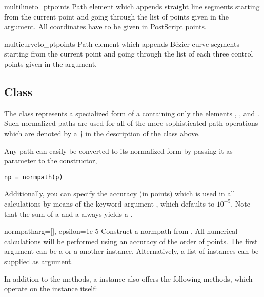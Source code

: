 \begin{classdesc}{multilineto_pt}{points}
Path element which appends straight line segments starting from
the current point and going through the list of points given 
in the  argument. All coordinates have to 
be given in PostScript points.
\end{classdesc}

\begin{classdesc}{multicurveto_pt}{points}
Path element which appends B\'ezier curve segments starting from
the current point and going through the list of each three control
points given in the  argument.
\end{classdesc}


\subsection{Class }

\label{path:normpath}

The  class represents a specialized form of a
 containing only the elements ,
,  and . Such normalized
paths are used for all of the more sophisticated path operations
which are denoted by a $\dagger$ in the description of the 
class above.

Any path can easily be converted to its normalized form by passing it
as parameter to the  constructor,
\begin{verbatim}
np = normpath(p)
\end{verbatim}
Additionally, you can specify the accuracy (in points) which is used
in all  calculations by means of the keyword argument
, which defaults to $10^{-5}$.  Note that the sum of a
 and a  always yields a .

\begin{classdesc}{normpath}{arg=[], epsilon=1e-5}
  Construct a normpath from . All numerical calculations will
  be performed using an accuracy of the order of  points.
  The first argument  can be a  or a another
   instance. Alternatively, a list of
   instances can be supplied as argument.
\end{classdesc}

In addition to the  methods, a  instance
also offers the following methods, which operate on the instance itself:

